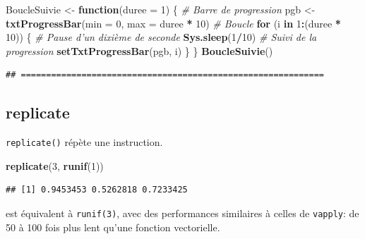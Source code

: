 \documentclass[
  12pt,
  french,
  a4paper,
  extrafontsizes,onecolumn,openright
  ]{memoir}
\newenvironment{Shaded}{\begin{snugshade}}{\end{snugshade}}
\newcommand{\CommentTok}[1]{\textcolor[rgb]{0.56,0.35,0.01}{\textit{#1}}}
\newcommand{\ControlFlowTok}[1]{\textcolor[rgb]{0.13,0.29,0.53}{\textbf{#1}}}
\newcommand{\DataTypeTok}[1]{\textcolor[rgb]{0.13,0.29,0.53}{#1}}
\newcommand{\DecValTok}[1]{\textcolor[rgb]{0.00,0.00,0.81}{#1}}
\newcommand{\KeywordTok}[1]{\textcolor[rgb]{0.13,0.29,0.53}{\textbf{#1}}}
\newcommand{\NormalTok}[1]{#1}
\newcommand{\OperatorTok}[1]{\textcolor[rgb]{0.81,0.36,0.00}{\textbf{#1}}}
\newcommand{\StringTok}[1]{\textcolor[rgb]{0.31,0.60,0.02}{#1}}
\newlength{\rf}
\begin{document}
\begin{Shaded}
\begin{Highlighting}[]
\NormalTok{BoucleSuivie <-}\StringTok{ }\ControlFlowTok{function}\NormalTok{(}\DataTypeTok{duree =} \DecValTok{1}\NormalTok{) \{}
    \CommentTok{# Barre de progression}
\NormalTok{    pgb <-}\StringTok{ }\KeywordTok{txtProgressBar}\NormalTok{(}\DataTypeTok{min =} \DecValTok{0}\NormalTok{, }\DataTypeTok{max =}\NormalTok{ duree }\OperatorTok{*}\StringTok{ }\DecValTok{10}\NormalTok{)}
    \CommentTok{# Boucle}
    \ControlFlowTok{for}\NormalTok{ (i }\ControlFlowTok{in} \DecValTok{1}\OperatorTok{:}\NormalTok{(duree }\OperatorTok{*}\StringTok{ }\DecValTok{10}\NormalTok{)) \{}
        \CommentTok{# Pause d'un dixième de seconde}
        \KeywordTok{Sys.sleep}\NormalTok{(}\DecValTok{1}\OperatorTok{/}\DecValTok{10}\NormalTok{)}
        \CommentTok{# Suivi de la progression}
        \KeywordTok{setTxtProgressBar}\NormalTok{(pgb, i)}
\NormalTok{    \}}
\NormalTok{\}}
\KeywordTok{BoucleSuivie}\NormalTok{()}
\end{Highlighting}
\end{Shaded}

\begin{verbatim}
## ============================================================
\end{verbatim}

\normalsize

\hypertarget{replicate}{%
\subsection{replicate}\label{replicate}}

\texttt{replicate()} répète une instruction.

\scriptsize

\begin{Shaded}
\begin{Highlighting}[]
\KeywordTok{replicate}\NormalTok{(}\DecValTok{3}\NormalTok{, }\KeywordTok{runif}\NormalTok{(}\DecValTok{1}\NormalTok{))}
\end{Highlighting}
\end{Shaded}

\begin{verbatim}
## [1] 0.9453453 0.5262818 0.7233425
\end{verbatim}

\normalsize

est équivalent à \texttt{runif(3)}, avec des performances similaires à celles de \texttt{vapply}: de 50 à 100 fois plus lent qu'une fonction vectorielle.
\end{document}
